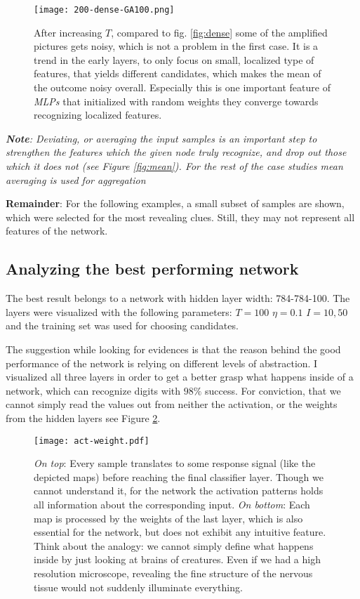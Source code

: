 \begin{figure}
    \centering
    \texttt{[image: 200-dense-GA100.png]}
    \caption{After increasing $T$, compared to fig. \ref{fig:dense} some of the amplified pictures gets noisy, which is not a problem in the first case. It is a trend in the early layers, to only focus on small, localized type of features, that yields different candidates, which makes the mean of the outcome noisy overall. Especially this is one important feature of \emph{MLPs} that initialized with random weights they converge towards recognizing localized features.}
    \label{fig:dense-100}
\end{figure}


\emph{\textbf{Note}: Deviating, or averaging the input samples is an important step to strengthen the features which the given node truly recognize, and drop out those which it does not (see Figure \ref{fig:mean}). For the rest of the case studies mean averaging is used for aggregation}

\textbf{Remainder}: For the following examples, a small subset of samples are shown, which were selected for the most revealing clues. Still, they may not represent all features of the network.


\subsection{Analyzing the best performing network}
The best result belongs to a network with hidden layer width: 784-784-100. 
The layers were visualized with the following parameters:
$T=100$
$\eta=0.1$
$I=10, 50$
and the training set was used for choosing candidates.

The suggestion while looking for evidences is that the reason behind the good performance of the network is relying on different levels of abstraction.
I visualized all three layers in order to get a better grasp what happens inside of a network, which can recognize digits with $98\%$ success.
For conviction, that we cannot simply read the values out from neither the activation, or the weights from the hidden layers see Figure \ref{fig:act-weight}.



\begin{figure}
    \centering
    \texttt{[image: act-weight.pdf]}
    \caption{\emph{On top}: Every sample translates to some response signal (like the depicted maps) before reaching the final classifier layer. 
    Though we cannot understand it, for the network the activation patterns holds all information about the corresponding input.
    \emph{On bottom}: Each map is processed by the weights of the last layer, which is also essential for the network, but does not exhibit any intuitive feature.
    Think about the analogy: we cannot simply define what happens inside by just looking at brains of creatures. 
    Even if we had a high resolution microscope, revealing the fine structure of the nervous tissue would not suddenly illuminate everything.
    }
    \label{fig:act-weight}
\end{figure}